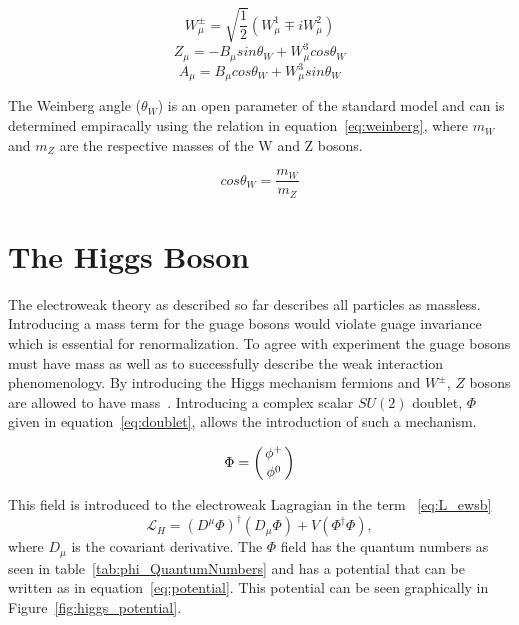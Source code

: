 \begin{equation} W^{\pm}_{\mu} = \sqrt{\dfrac{1}{2}}(W^1_{\mu} \mp iW^2_{\mu}) \label{eq:Ws}\end{equation}
\begin{equation} Z_{\mu} = -B_{\mu} sin \theta_W + W^3_{\mu} cos \theta_W \label{eq:Z}\end{equation}
\begin{equation} A_{\mu} = B_{\mu} cos \theta_W + W^3_{\mu} sin \theta_W \label{eq:gamma}\end{equation}

The Weinberg angle ($\theta_W$) is an open parameter of the standard model and can is determined empiracally using the relation in equation~\ref{eq:weinberg}, where $m_W$ and $m_Z$ are the respective masses of the W and Z bosons. 

\begin{equation} cos \theta_W = \dfrac{m_W}{m_Z} \label{eq:weinberg}\end{equation}









\section{The Higgs Boson}

The electroweak theory as described so far describes all particles as massless.  Introducing a mass term for the guage bosons would violate guage invariance which is essential for renormalization.  To agree with experiment the guage bosons must have mass as well as to successfully describe the weak interaction phenomenology. By introducing the Higgs mechanism fermions and $W^{\pm}$, $Z$ bosons are allowed to have mass~\cite{Dawson98}.   Introducing a complex scalar $S U(2)$ doublet, $\Phi$ given in equation~\ref{eq:doublet}, allows the introduction of such a mechanism.

\begin{equation} \Phi = \left( \genfrac{}{}{0pt}{}{\phi^+}{\phi^0}  \right) \label{eq:doublet}\end{equation}

This field is introduced to the electroweak Lagragian in the term ~\ref{eq:L_ewsb} \begin{equation} \mathcal{L}_{H}  = (D^{\mu}\Phi)^{\dagger}(D_{\mu}\Phi) + V(\Phi^{\dagger} \Phi), \label{eq:L_ewsb}\end{equation} where $D_{\mu}$ is the covariant derivative. The $\Phi$ field has the quantum numbers as seen in table~\ref{tab:phi_QuantumNumbers} and has a potential that can be written as in equation~\ref{eq:potential}.  This potential can be seen graphically in Figure~\ref{fig:higgs_potential}.

